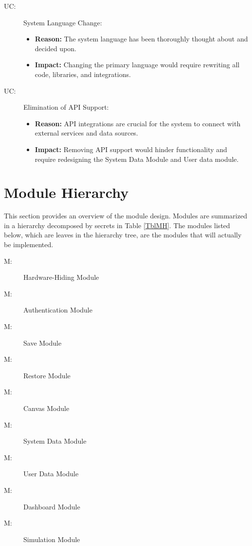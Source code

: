 \documentclass[12pt, titlepage]{article}
\newcounter{ucnum}
\newcommand{\uctheucnum}{UC\theucnum}
\newcounter{mnum}
\newcommand{\mthemnum}{M\themnum}
\begin{document}
\begin{description}
\item[ \uctheucnum \label{ucLanguage}:] System Language Change:
  \begin{itemize}
    \item \textbf{Reason:} The system language has been thoroughly thought about and decided upon.
    \item \textbf{Impact:} Changing the primary language would require rewriting all code, libraries, and integrations.
  \end{itemize}

\item[ \uctheucnum \label{ucAPI}:] Elimination of API Support:
  \begin{itemize}
    \item \textbf{Reason:} API integrations are crucial for the system to connect with external services and data sources.
    \item \textbf{Impact:} Removing API support would hinder functionality and require redesigning the System Data Module and User data module.
  \end{itemize}

\end{description}




\section{Module Hierarchy} \label{SecMH}

This section provides an overview of the module design. Modules are summarized
in a hierarchy decomposed by secrets in Table \ref{TblMH}. The modules listed
below, which are leaves in the hierarchy tree, are the modules that will
actually be implemented.

\begin{description}
\item [ \mthemnum \label{mHH}:] Hardware-Hiding Module
\item [ \mthemnum \label{mAuth}:] Authentication Module
\item [ \mthemnum \label{mSave}:] Save Module
\item [ \mthemnum \label{mRestore}:] Restore Module
\item [ \mthemnum \label{mCanvas}:] Canvas Module
\item [ \mthemnum \label{mSystem}:] System Data Module
\item [ \mthemnum \label{mUser}:] User Data Module
\item [ \mthemnum \label{mDashboard}:] Dashboard Module
\item [ \mthemnum \label{mSimulation}:] Simulation Module
\end{description}
\end{document}
